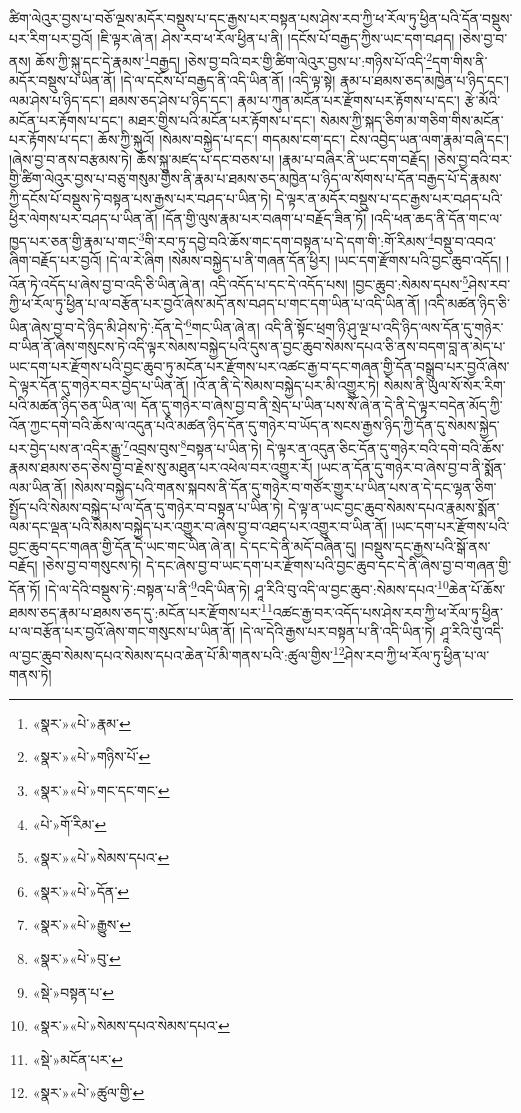 ཚིག་ལེའུར་བྱས་པ་བཅོ་ལྔས་མདོར་བསྡུས་པ་དང་རྒྱས་པར་བསྟན་པས་ཤེས་རབ་ཀྱི་ཕ་རོལ་ཏུ་ཕྱིན་པའི་དོན་བསྡུས་པར་རིག་པར་བྱའོ། །ཇི་ལྟར་ཞེ་ན། ཤེས་རབ་ཕ་རོལ་ཕྱིན་པ་ནི། །དངོས་པོ་བརྒྱད་ཀྱིས་ཡང་དག་བཤད། །ཅེས་བྱ་བ་ནས། ཆོས་ཀྱི་སྐུ་དང་དེ་རྣམས་\footnote{«སྣར་»«པེ་»རྣམ་}བརྒྱད། །ཅེས་བྱ་བའི་བར་གྱི་ཚིག་ལེའུར་བྱས་པ་:གཉིས་པོ་འདི་\footnote{«སྣར་»«པེ་»གཉིས་པོ་}དག་གིས་ནི་མདོར་བསྡུས་པ་ཡིན་ནོ། །དེ་ལ་དངོས་པོ་བརྒྱད་ནི་འདི་ཡིན་ནོ། །འདི་ལྟ་སྟེ། རྣམ་པ་ཐམས་ཅད་མཁྱེན་པ་ཉིད་དང་། ལམ་ཤེས་པ་ཉིད་དང་། ཐམས་ཅད་ཤེས་པ་ཉིད་དང་། རྣམ་པ་ཀུན་མངོན་པར་རྫོགས་པར་རྟོགས་པ་དང་། རྩེ་མོའི་མངོན་པར་རྟོགས་པ་དང་། མཐར་གྱིས་པའི་མངོན་པར་རྟོགས་པ་དང་། སེམས་ཀྱི་སྐད་ཅིག་མ་གཅིག་གིས་མངོན་པར་རྟོགས་པ་དང་། ཆོས་ཀྱི་སྐུའོ། །སེམས་བསྐྱེད་པ་དང་། གདམས་ངག་དང་། ངེས་འབྱེད་ཡན་ལག་རྣམ་བཞི་དང་། །ཞེས་བྱ་བ་ནས་བརྩམས་ཏེ། ཆོས་སྐུ་མཛད་པ་དང་བཅས་པ། །རྣམ་པ་བཞིར་ནི་ཡང་དག་བརྗོད། །ཅེས་བྱ་བའི་བར་གྱི་ཚིག་ལེའུར་བྱས་པ་བཅུ་གསུམ་གྱིས་ནི་རྣམ་པ་ཐམས་ཅད་མཁྱེན་པ་ཉིད་ལ་སོགས་པ་དོན་བརྒྱད་པོ་དེ་རྣམས་ཀྱི་དངོས་པོ་བསྡུས་ཏེ་བསྟན་པས་རྒྱས་པར་བཤད་པ་ཡིན་ཏེ། དེ་ལྟར་ན་མདོར་བསྡུས་པ་དང་རྒྱས་པར་བཤད་པའི་ཕྱིར་ལེགས་པར་བཤད་པ་ཡིན་ནོ། །དོན་གྱི་ལུས་རྣམ་པར་བཞག་པ་བརྗོད་ཟིན་ཏོ། །འདི་ཕན་ཆད་ནི་དོན་གང་ལ་ཁྱད་པར་ཅན་གྱི་རྣམ་པ་གང་\footnote{«སྣར་»«པེ་»གང་དང་གང་}གི་རབ་ཏུ་དབྱེ་བའི་ཆོས་གང་དག་བསྟན་པ་དེ་དག་གི་:གོ་རིམས་\footnote{«པེ་»གོ་རིམ་}བསྡུ་བ་འབའ་ཞིག་བརྗོད་པར་བྱའོ། །དེ་ལ་རེ་ཞིག །སེམས་བསྐྱེད་པ་ནི་གཞན་དོན་ཕྱིར། །ཡང་དག་རྫོགས་པའི་བྱང་ཆུབ་འདོད། །འོན་ཏེ་འདོད་པ་ཞེས་བྱ་བ་འདི་ཅི་ཡིན་ཞེ་ན། འདི་འདོད་པ་དང་དེ་འདོད་པས། །བྱང་ཆུབ་:སེམས་དཔས་\footnote{«སྣར་»«པེ་»སེམས་དཔའ་}ཤེས་རབ་ཀྱི་ཕ་རོལ་ཏུ་ཕྱིན་པ་ལ་བརྩོན་པར་བྱའོ་ཞེས་མདོ་ནས་བཤད་པ་གང་དག་ཡིན་པ་འདི་ཡིན་ནོ། །འདི་མཚན་ཉིད་ཅི་ཡིན་ཞེས་བྱ་བ་དེ་ཉིད་མི་ཤེས་ཏེ་:དོན་དེ་\footnote{«སྣར་»«པེ་»དོན་}གང་ཡིན་ཞེ་ན། འདི་ནི་སྟོང་ཕྲག་ཉི་ཤུ་ལྔ་པ་འདི་ཉིད་ལས་དོན་དུ་གཉེར་བ་ཡིན་ནོ་ཞེས་གསུངས་ཏེ་འདི་ལྟར་སེམས་བསྐྱེད་པའི་དུས་ན་བྱང་ཆུབ་སེམས་དཔའ་ཅི་ནས་བདག་བླ་ན་མེད་པ་ཡང་དག་པར་རྫོགས་པའི་བྱང་ཆུབ་ཏུ་མངོན་པར་རྫོགས་པར་འཚང་རྒྱ་བ་དང་གཞན་གྱི་དོན་བསྒྲུབ་པར་བྱའོ་ཞེས་དེ་ལྟར་དོན་དུ་གཉེར་བར་བྱེད་པ་ཡིན་ནོ། །འོ་ན་ནི་དེ་སེམས་བསྐྱེད་པར་མི་འགྱུར་ཏེ། སེམས་ནི་ཡུལ་སོ་སོར་རིག་པའི་མཚན་ཉིད་ཅན་ཡིན་ལ། དོན་དུ་གཉེར་བ་ཞེས་བྱ་བ་ནི་སྲེད་པ་ཡིན་པས་སོ་ཞེ་ན་དེ་ནི་དེ་ལྟར་བདེན་མོད་ཀྱི་འོན་ཀྱང་དགེ་བའི་ཆོས་ལ་འདུན་པའི་མཚན་ཉིད་དོན་དུ་གཉེར་བ་ཡོད་ན་སངས་རྒྱས་ཉིད་ཀྱི་དོན་དུ་སེམས་སྐྱེད་པར་བྱེད་པས་ན་འདིར་རྒྱུ་\footnote{«སྣར་»«པེ་»རྒྱུས་}འབྲས་བུས་\footnote{«སྣར་»«པེ་»བུ་}བསྟན་པ་ཡིན་ཏེ། དེ་ལྟར་ན་འདུན་ཅིང་དོན་དུ་གཉེར་བའི་དགེ་བའི་ཆོས་རྣམས་ཐམས་ཅད་ཅེས་བྱ་བ་རྗེས་སུ་མཐུན་པར་འཕེལ་བར་འགྱུར་རོ། །ཡང་ན་དོན་དུ་གཉེར་བ་ཞེས་བྱ་བ་ནི་སྨོན་ལམ་ཡིན་ནོ། །སེམས་བསྐྱེད་པའི་གནས་སྐབས་ནི་དོན་དུ་གཉེར་བ་གཙོར་གྱུར་པ་ཡིན་པས་ན་དེ་དང་ལྷན་ཅིག་སྤྱོད་པའི་སེམས་བསྐྱེད་པ་ལ་དོན་དུ་གཉེར་བ་བསྟན་པ་ཡིན་ཏེ། དེ་ལྟ་ན་ཡང་བྱང་ཆུབ་སེམས་དཔའ་རྣམས་སྨོན་ལམ་དང་ལྡན་པའི་སེམས་བསྐྱེད་པར་འགྱུར་བ་ཞེས་བྱ་བ་འཐད་པར་འགྱུར་བ་ཡིན་ནོ། །ཡང་དག་པར་རྫོགས་པའི་བྱང་ཆུབ་དང་གཞན་གྱི་དོན་དེ་ཡང་གང་ཡིན་ཞེ་ན། དེ་དང་དེ་ནི་མདོ་བཞིན་དུ། །བསྡུས་དང་རྒྱས་པའི་སྒོ་ནས་བརྗོད། །ཅེས་བྱ་བ་གསུངས་ཏེ། དེ་དང་ཞེས་བྱ་བ་ཡང་དག་པར་རྫོགས་པའི་བྱང་ཆུབ་དང་དེ་ནི་ཞེས་བྱ་བ་གཞན་གྱི་དོན་ཏོ། །དེ་ལ་དེའི་བསྡུས་ཏེ་:བསྟན་པ་ནི་\footnote{«སྡེ་»བསྟན་པ་}འདི་ཡིན་ཏེ། ཤཱ་རིའི་བུ་འདི་ལ་བྱང་ཆུབ་:སེམས་དཔའ་\footnote{«སྣར་»«པེ་»སེམས་དཔའ་སེམས་དཔའ་}ཆེན་པོ་ཆོས་ཐམས་ཅད་རྣམ་པ་ཐམས་ཅད་དུ་:མངོན་པར་རྫོགས་པར་\footnote{«སྡེ་»མངོན་པར་}འཚང་རྒྱ་བར་འདོད་པས་ཤེས་རབ་ཀྱི་ཕ་རོལ་ཏུ་ཕྱིན་པ་ལ་བརྩོན་པར་བྱའོ་ཞེས་གང་གསུངས་པ་ཡིན་ནོ། །དེ་ལ་དེའི་རྒྱས་པར་བསྟན་པ་ནི་འདི་ཡིན་ཏེ། ཤཱ་རིའི་བུ་འདི་ལ་བྱང་ཆུབ་སེམས་དཔའ་སེམས་དཔའ་ཆེན་པོ་མི་གནས་པའི་:ཚུལ་གྱིས་\footnote{«སྣར་»«པེ་»ཚུལ་གྱི་}ཤེས་རབ་ཀྱི་ཕ་རོལ་ཏུ་ཕྱིན་པ་ལ་གནས་ཏེ། 
